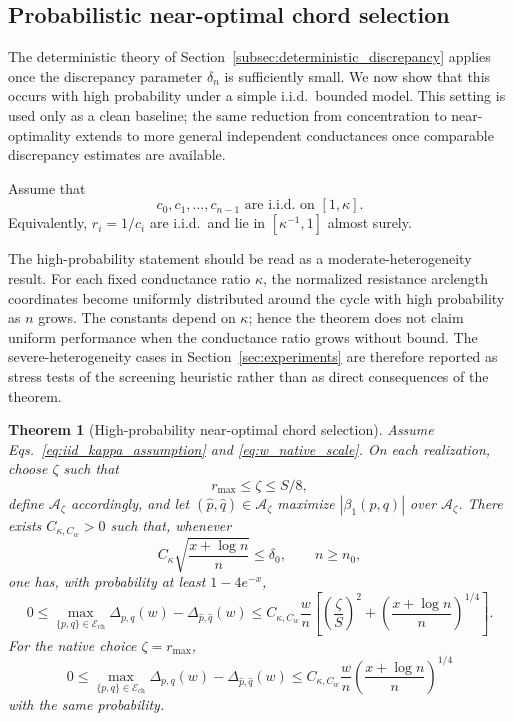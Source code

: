 \documentclass[11pt]{article}
\numberwithin{equation}{section}
\newtheorem{theorem}{Theorem}[section]
\theoremstyle{definition}
\theoremstyle{remark}
\begin{document}
\subsection{Probabilistic near-optimal chord selection}\label{subsec:probabilistic_discrepancy}

The deterministic theory of
Section~\ref{subsec:deterministic_discrepancy} applies once the discrepancy
parameter $\delta_n$ is sufficiently small. We now show that this occurs
with high probability under a simple i.i.d.\ bounded model. This setting is
used only as a clean baseline; the same reduction from concentration to
near-optimality extends to more general independent conductances once
comparable discrepancy estimates are available.

Assume that
\begin{equation}\label{eq:iid_kappa_assumption}
	c_0,c_1,\dots,c_{n-1}\text{ are i.i.d.\ on }[1,\kappa].
\end{equation}
Equivalently, $r_i=1/c_i$ are i.i.d.\ and lie in $[\kappa^{-1},1]$
almost surely.


The high-probability statement should be read as a moderate-heterogeneity result. For each fixed conductance ratio $\kappa$, the normalized resistance arclength coordinates become uniformly distributed around the cycle with high probability as $n$ grows. The constants depend on $\kappa$; hence the theorem does not claim uniform performance when the conductance ratio grows without bound. The severe-heterogeneity cases in Section~\ref{sec:experiments} are therefore reported as stress tests of the screening heuristic rather than as direct consequences of the theorem.

\begin{theorem}[High-probability near-optimal chord selection]\label{thm:main_optimal_random}
	Assume Eqs.~\eqref{eq:iid_kappa_assumption} and \eqref{eq:w_native_scale}.
	On each realization, choose $\zeta$ such that
	\[
	r_{\max}\le \zeta\le S/8,
	\]
	define $\mathcal A_\zeta$ accordingly, and let
	$(\widehat p,\widehat q)\in\mathcal A_\zeta$ maximize
	$|\beta_1(p,q)|$ over $\mathcal A_\zeta$. There exists
	$C_{\kappa,C_w}>0$ such that, whenever
	\[
	C_\kappa\sqrt{\frac{x+\log n}{n}}\le \delta_0,
	\qquad
	n\ge n_0,
	\]
	one has, with probability at least $1-4e^{-x}$,
	\begin{equation}\label{eq:main_random_additive}
		0\le
		\max_{\{p,q\}\in\mathcal{E}_{\mathrm{ch}}}\Delta_{p,q}(w)-\Delta_{\widehat p,\widehat q}(w)
		\le
		C_{\kappa,C_w}\frac{w}{n}
		\left[
		\left(\frac{\zeta}{S}\right)^2+
		\left(\frac{x+\log n}{n}\right)^{1/4}
		\right].
	\end{equation}
	For the native choice $\zeta=r_{\max}$,
	\begin{equation}\label{eq:main_random_additive_native}
		0\le
		\max_{\{p,q\}\in\mathcal{E}_{\mathrm{ch}}}\Delta_{p,q}(w)-\Delta_{\widehat p,\widehat q}(w)
		\le
		C_{\kappa,C_w}\frac{w}{n}
		\left(\frac{x+\log n}{n}\right)^{1/4}
	\end{equation}
	with the same probability.
\end{theorem}
\end{document}
